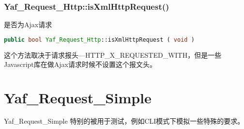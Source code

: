 \subsection{Yaf\_Request\_Http::isXmlHttpRequest()}

是否为Ajax请求


\begin{lstlisting}[language=PHP]
public bool Yaf_Request_Http::isXmlHttpRequest ( void )
\end{lstlisting}

这个方法取决于请求报头—HTTP\_X\_REQUESTED\_WITH，但是一些Javascript库在做Ajax请求时候不设置这个报文头。


\chapter{Yaf\_Request\_Simple}


Yaf\_Request\_Simple 特别的被用于测试，例如CLI模式下模拟一些特殊的要求。


